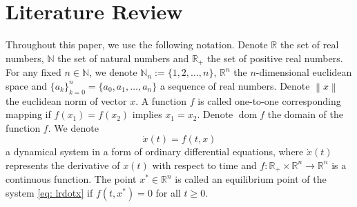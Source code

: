 \documentclass[11pt]{article}
\theoremstyle{definition}
\DeclareMathOperator{\dom}{dom}
\begin{document}
\section{Literature Review}
\label{sec: literaturereview}

Throughout this paper, we use the following notation. Denote $\mathbb{R}$ the set of real numbers, $\mathbb{N}$ the set of natural numbers and $\mathbb{R}_{+}$ the set of positive real numbers. For any fixed $n \in \mathbb{N}$, we denote $\mathbb{N}_n := \{ 1, 2, \dots, n \}$, $\mathbb{R}^n$ the $n$-dimensional euclidean space and $\{ a_k \}_{k=0}^{n} = \{ a_0, a_1, \dots, a_n \}$ a sequence of real numbers. Denote $ \left\lVert x \right\rVert$ the euclidean norm of vector $x$. A function $f$ is called one-to-one corresponding mapping if $f(x_1) = f(x_2)$ implies $x_1 = x_2$. Denote $\dom{f}$ the domain of the function $f$. We denote 
\begin{equation} \label{eq: lrdotx}
\dot{x}(t) = f(t, x)
\end{equation} 
a dynamical system in a form of ordinary differential equations, where $\dot{x}(t)$ represents the derivative of $x(t)$ with respect to time and $f:\mathbb{R}_{+} \times \mathbb{R}^n \to \mathbb{R}^n$ is a continuous function. The point $x^* \in \mathbb{R}^n$ is called an equilibrium point of the system \eqref{eq: lrdotx} if $f(t, x^*) = 0 $ for all $t \geq 0$.
\end{document}
